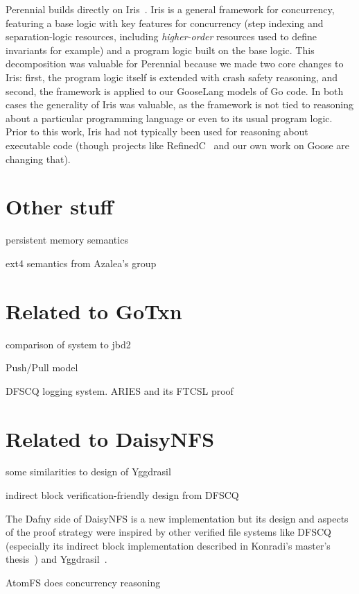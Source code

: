 Perennial builds directly on Iris~\cite{jung:iris-jfp}. Iris is a general
framework for concurrency, featuring a base logic with key features for
concurrency (step indexing and separation-logic resources, including
\emph{higher-order} resources used to define invariants for example) and a
program logic built on the base logic. This decomposition was valuable for
Perennial because we made two core changes to Iris: first, the program logic
itself is extended with crash safety reasoning, and second, the framework is
applied to our GooseLang models of Go code. In both cases the generality of Iris
was valuable, as the framework is not tied to reasoning about a particular
programming language or even to its usual program logic. Prior to this work,
Iris had not typically been used for reasoning about executable code (though
projects like RefinedC~\cite{sammler:refinedc} and our own work on Goose are
changing that).

\section{Other stuff}

persistent memory semantics

ext4 semantics from Azalea's group

\section{Related to GoTxn}

comparison of system to jbd2

Push/Pull model

DFSCQ logging system. ARIES and its FTCSL proof



\section{Related to DaisyNFS}

some similarities to design of Yggdrasil

indirect block verification-friendly design from DFSCQ

The Dafny side of DaisyNFS is a new implementation but its design and aspects of
the proof strategy were inspired by other verified file systems like
DFSCQ~\cite{chen:dfscq} (especially its indirect block implementation described
in Konradi's master's thesis~\cite{akonradi-meng}) and
Yggdrasil~\cite{sigurbjarnarson:yggdrasil}.

AtomFS does concurrency reasoning


